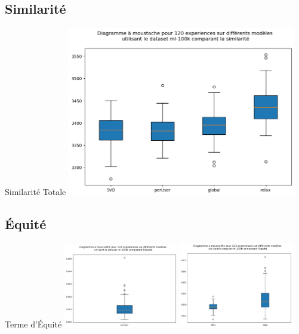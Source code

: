 \documentclass{beamer}
\begin{document}
\subsection{Similarité}
\begin{frame}{Similarité Totale}
  \includegraphics[width = 10cm]{sim1}

\end{frame}
\subsection{Équité}
\begin{frame}{Terme d'Équité}
  \includegraphics[width = 5cm]{eq2}
  \includegraphics[width = 5cm]{eq3}
\end{frame}
\end{document}
